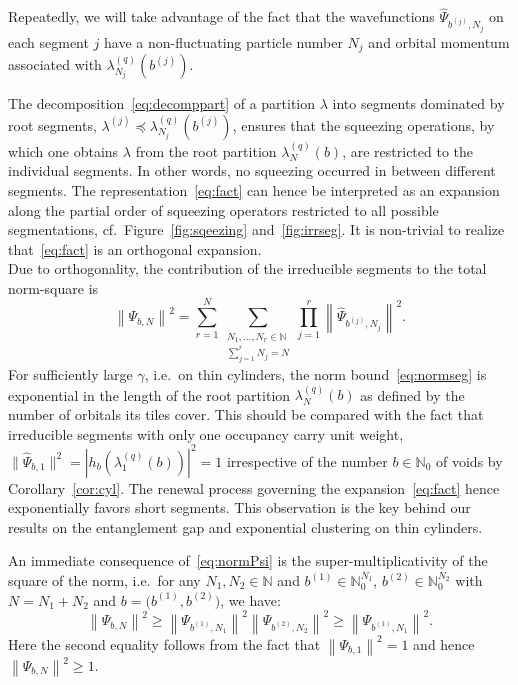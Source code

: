 \documentclass[letterpaper, DIV=17]{scrartcl}
\numberwithin{equation}{section}
\theoremstyle{definition}
\begin{document}
Repeatedly, we will take advantage of the fact that the wavefunctions $ 	 \widehat \Psi_{b^{(j)},N_j}  $ on each segment $ j $ have a non-fluctuating particle number $ N_j $ and orbital momentum associated with $ \lambda^{(q)}_{N_j}(b^{(j)})  $. 



The decomposition~\eqref{eq:decomppart} of a partition $ \lambda $ into segments dominated by root segments, $  \lambda^{(j)}  \preceq \lambda^{(q)}_{N_j}(b^{(j)}) $, ensures that the squeezing operations, by which one obtains $ \lambda $ from the root partition $ \lambda_N^{(q)}(b) $, are restricted to the individual segments. In other words, no squeezing occurred in between different segments. The representation~\eqref{eq:fact} can hence be interpreted as an expansion along the partial order of squeezing operators restricted to all possible segmentations, cf.~Figure~\ref{fig:sqeezing} and~\ref{fig:irrseg}. It is non-trivial to realize that~\eqref{eq:fact}  is an orthogonal expansion. \\

Due to orthogonality, the contribution of the irreducible segments to the total norm-square is
\begin{equation}\label{eq:normPsi}
\left\|  \Psi_{b,N}  \right\|^2 = \sum_{r=1}^N \sum_{ \substack{N_1, \dots , N_r \in \mathbb{N}\\  \sum_{j=1}^r N_j = N } } \prod_{j=1}^r  \left\|   \widehat \Psi_{b^{(j)},N_j} \right\|^2 .
\end{equation}
For sufficiently large $\gamma $, i.e.\ on thin cylinders, the norm bound~\eqref {eq:normseg} is exponential in the length of the root partition $ \lambda_N^{(q)}(b) $ as defined by the number of orbitals its tiles cover.  
This should be compared with the fact that irreducible segments with only one occupancy carry unit weight,  $ \|  \widehat \Psi_{b,1}  \|^2 = |h_b(\lambda_1^{(q)}(b)) |^2 = 1 $ irrespective of the number $ b \in \mathbb{N}_0 $ of voids by Corollary~\ref{cor:cyl}. 
The renewal process governing the expansion~\eqref{eq:fact} hence exponentially favors short segments. This observation is the key behind our results on the entanglement gap and exponential clustering on thin cylinders. 



An immediate consequence of~\eqref{eq:normPsi}  is the super-multiplicativity of the square of the norm, i.e.\ for any  $ N_1 , N_2 \in \mathbb{N} $ and $ b^{(1)} \in \mathbb{N}_0^{N_1} $, $  b^{(2)} \in \mathbb{N}_0^{N_2} $ with $ N = N_1 + N_2 $ and $ b= \big(b^{(1)}, b^{(2)} \big) $, we have:
\begin{equation}\label{eq:supermult}
\left\|  \Psi_{b,N}  \right\|^2 \geq \left\|  \Psi_{b^{(1)},N_1}  \right\|^2  \left\|  \Psi_{b^{(2)},N_2}  \right\|^2 \geq  \left\|  \Psi_{b^{(1)},N_1}  \right\|^2 .
\end{equation}
Here the second equality follows from the fact that $ \left\|  \Psi_{b,1}  \right\|^2 = 1 $ and hence $ \left\|  \Psi_{b,N}  \right\|^2  \geq 1 $. \\
% 
\end{document}
